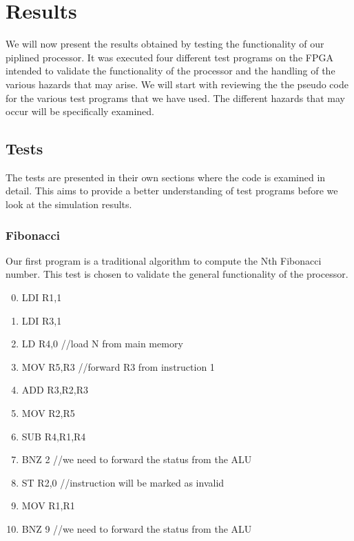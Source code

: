 \documentclass[11pt]{article}
\begin{document}
\section{Results}
\label{sec:results} 

We will now present the results obtained by testing the functionality
of our piplined processor.  It was executed four different test
programs on the FPGA intended to validate the functionality of the
processor and the handling of the various hazards that may arise.  We
will start with reviewing the the pseudo code for the various test
programs that we have used.  The different hazards that may occur will
be specifically examined.


\subsection{Tests}
\label{subsec:tests}

The tests are presented in their own sections where the code is
examined in detail. This aims to provide a better understanding of
test programs before we look at the simulation results.

\subsubsection*{Fibonacci}
Our first program is a traditional algorithm to compute the Nth
Fibonacci number. This test is chosen to validate the general
functionality of the processor.
\begin{enumerate}
\setcounter{enumi}{-1}
\item LDI R1,1
\item LDI R3,1
\item LD R4,0 //load N from main memory
\item MOV R5,R3 //forward R3 from instruction 1
\item ADD R3,R2,R3
\item MOV R2,R5
\item SUB R4,R1,R4
\item BNZ 2 //we need to forward the status from the ALU
\item ST R2,0 //instruction will be marked as invalid
\item MOV R1,R1
\item BNZ 9 //we need to forward the status from the ALU
\end{enumerate}
\end{document}
